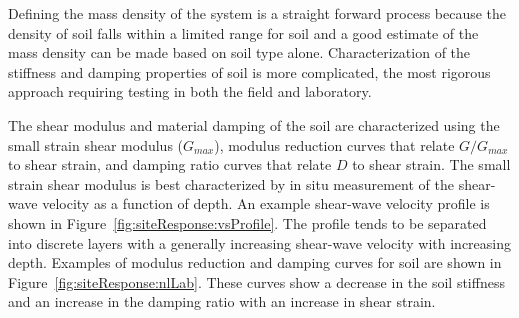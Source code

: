 \documentclass[11pt]{report}
\begin{document}
Defining the mass density of the system is a straight forward process because the density of soil falls
within a limited range for soil and a good estimate of the mass density can be made based on soil
type alone.  Characterization of the stiffness and damping properties of soil is more complicated,
the most rigorous approach requiring testing in both the field and laboratory.  

The shear modulus and material damping of the soil are characterized using the small strain shear
modulus ($G_{max}$), modulus reduction curves that relate $G/G_{max}$ to shear strain, and damping
ratio curves that relate $D$ to shear strain.  The small strain shear modulus is best
characterized by in situ measurement of the shear-wave velocity as a function of depth.  An example
shear-wave velocity profile is shown in Figure~\ref{fig:siteResponse:vsProfile}. The profile tends to be
separated into discrete layers with a generally increasing shear-wave velocity with increasing
depth.  Examples of modulus reduction and damping curves for soil are shown in
Figure~\ref{fig:siteResponse:nlLab}.  These curves show a decrease in the soil stiffness and an
increase in the damping ratio with an increase in shear strain. 
\end{document}
